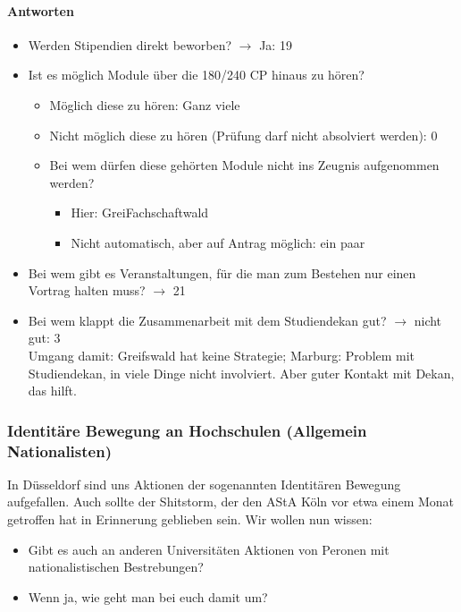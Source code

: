       \paragraph{Antworten}
        \begin{itemize}
          \item Werden Stipendien direkt beworben? $\rightarrow$ Ja: 19
          \item Ist es möglich Module über die 180/240 CP hinaus zu hören?
            \begin{itemize}
              \item Möglich diese zu hören: Ganz viele
              \item Nicht möglich diese zu hören (Prüfung darf nicht absolviert werden): 0
              \item Bei wem dürfen diese gehörten Module nicht ins Zeugnis aufgenommen werden?
                \begin{itemize}
                  \item Hier: GreiFachschaftwald
                  \item Nicht automatisch, aber auf Antrag möglich: ein paar
                \end{itemize}
            \end{itemize}
          \item Bei wem gibt es Veranstaltungen, für die man zum Bestehen nur einen Vortrag halten muss? $\rightarrow$ 21
          \item Bei wem klappt die Zusammenarbeit mit dem Studiendekan gut? $\rightarrow$ nicht gut: 3 \\
            Umgang damit: Greifswald hat keine Strategie;
              Marburg: Problem mit Studiendekan, in viele Dinge nicht involviert. Aber guter Kontakt mit Dekan, das hilft.
        \end{itemize}

    \subsubsection*{Identitäre Bewegung an Hochschulen (Allgemein Nationalisten)}


      In Düsseldorf sind uns Aktionen der sogenannten Identitären Bewegung aufgefallen. Auch sollte der Shitstorm, der den AStA Köln vor etwa einem Monat getroffen hat in Erinnerung geblieben sein. Wir wollen nun wissen:
      \begin{itemize}
        \item Gibt es auch an anderen Universitäten Aktionen von Peronen mit nationalistischen Bestrebungen?
        \item Wenn ja, wie geht man bei euch damit um?
      \end{itemize}

